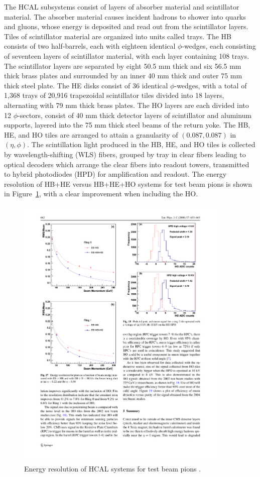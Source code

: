 \indent The HCAL subsystems consist of layers of absorber material and scintillator material. The absorber material causes incident hadrons to shower into quarks and gluons, whose energy is deposited and read out from the scintillator layers. Tiles of scintillator material are organized into units called trays. The HB consists of two half-barrels, each with eighteen identical $\phi$-wedges, each consisting of seventeen layers of scintillator material, with each layer containing 108 trays. The scintillator layers are separated by eight 50.5 mm thick and six 56.5 mm thick brass plates and surrounded by an inner 40 mm thick and outer 75 mm thick steel plate. The HE disks consist of 36 identical $\phi$-wedges, with a total of 1,368 trays of 20,916 trapezoidal scintillator tiles divided into 18 layers, alternating with 79 mm thick brass plates. The HO layers are each divided into 12 $\phi$-sectors, consist of 40 mm thick detector layers of scintillator and aluminum supports, layered into the 75 mm thick steel beams of the return yoke. The HB, HE, and HO tiles are arranged to attain a granularity of $(0.087, 0.087)$ in $(\eta, \phi)$. The scintillation light produced in the HB, HE, and HO tiles is collected by wavelength-shifting (WLS) fibers, grouped by tray in clear fibers leading to optical decoders which arrange the clear fibers into readout towers, transmitted to hybrid photodiodes (HPD) for amplification and readout. The energy resolution of HB+HE versus HB+HE+HO systems for test beam pions is shown in Figure~\ref{fig:eres_hcal}, with a clear improvement when including the HO.

\begin{figure}[tbh]
\centering
\includegraphics[width=4in]{figures/eres_hcal.pdf}
\caption{Energy resolution of HCAL systems for test beam pions \cite{1748-0221-3-08-S08004}.}
\label{fig:eres_hcal}
\end{figure}

